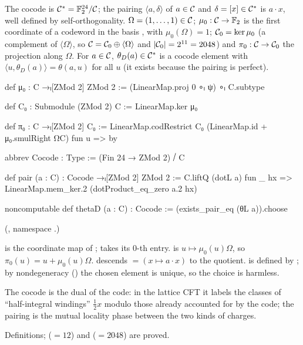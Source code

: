 \begin{definition}\label{ch21:def:cocode}
The cocode is $\mathcal{C}^*=\mathbb{F}_2^{24}/\mathcal{C}$; the pairing $\langle a,\delta\rangle$ of
$a\in\mathcal{C}$ and $\delta=[x]\in\mathcal{C}^*$ is $a\cdot x$, well defined by self-orthogonality.
$\Omega=(1,\dots,1)\in\mathcal{C}$; $\mu_0:\mathcal{C}\to\mathbb{F}_2$ is the first coordinate of a codeword in
the basis , with $\mu_0(\Omega)=1$; $\mathcal{C}_0=\ker\mu_0$ (a complement of
$\langle\Omega\rangle$, so $\mathcal{C}=\mathcal{C}_0\oplus\langle\Omega\rangle$ and $|\mathcal{C}_0|=2^{11}=2048$) and $\pi_0:\mathcal{C}\to\mathcal{C}_0$ the projection along
$\Omega$.  For $a\in\mathcal{C}$, $\theta_D(a)\in\mathcal{C}^*$ is a cocode element with
$\langle u,\theta_D(a)\rangle=\theta(a,u)$ for all $u$ (it exists because the pairing is perfect).
\end{definition}
\begin{leancode}
def μ₀ : C →ₗ[ZMod 2] ZMod 2 := (LinearMap.proj 0 ∘ₗ ψ) ∘ₗ C.subtype
\end{leancode}
\begin{leancode}
def C₀ : Submodule (ZMod 2) C := LinearMap.ker μ₀
\end{leancode}
\begin{leancode}
def π₀ : C →ₗ[ZMod 2] C₀ :=
  LinearMap.codRestrict C₀ (LinearMap.id + μ₀.smulRight ΩC) fun u => by
\end{leancode}
\begin{leancode}
abbrev Cocode : Type := (Fin 24 → ZMod 2) ⧸ C
\end{leancode}
\begin{leancode}
def pair (a : C) : Cocode →ₗ[ZMod 2] ZMod 2 :=
  C.liftQ (dotL a) fun _ hx => LinearMap.mem_ker.2 (dotProduct_eq_zero a.2 hx)
\end{leancode}
\begin{leancode}
noncomputable def thetaD (a : C) : Cocode := (exists_pair_eq (θL a)).choose
\end{leancode}
(, namespace .)
\begin{dictionary}
 is the coordinate map of ;  takes its $0$-th entry.
 is $u\mapsto\mu_0(u)\Omega$, so $\pi_0(u)=u+\mu_0(u)\Omega$.
 descends  $=(x\mapsto a\cdot x)$ to the quotient.   is
defined by ; by nondegeneracy () the chosen
element is unique, so the choice is harmless.
\end{dictionary}
\begin{physics}
The cocode is the dual of the code: in the lattice CFT it labels the classes of ``half-integral
windings'' $\tfrac12x$ modulo those already accounted for by the code; the pairing is the mutual
locality phase between the two kinds of charges.
\end{physics}
\begin{status}
Definitions;  ($=12$) and  ($=2048$) are proved.
\end{status}

